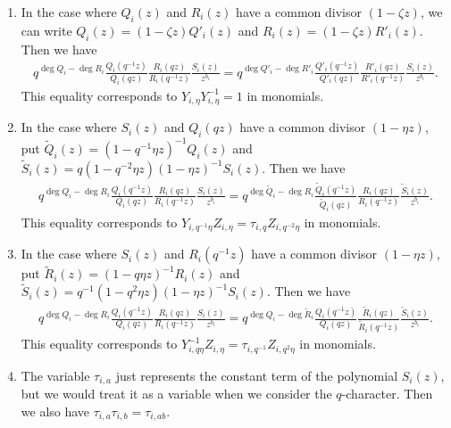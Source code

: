 \documentclass[12pt]{amsart}
\numberwithin{equation}{thm}
\newcommand\z{\zeta}
\newcommand\wt{\widetilde}
\begin{document}
\begin{enumerate}
\item 
In the case where $Q_i(z)$ and $R_i(z)$ have a common divisor $(1 - \z z)$, 
we can write $Q_i(z) = (1 - \z z) Q'_i(z)$ and $R_i (z) = (1- \z z) R'_i(z)$. 
Then we have 
\begin{align}
\label{common Q R}
q^{\deg Q_i - \deg R_i} \frac{Q_i (q^{-1} z)}{Q_i(qz)} \frac{ R_i( q z)}{ R_i (q^{-1} z)} \frac{S_i(z)}{z^{b_i}}
= q^{ \deg Q'_i - \deg R'_i} \frac{Q'_i (q^{-1} z)}{Q'_i(qz)} \frac{ R'_i( q z)}{ R'_i (q^{-1} z)} \frac{S_i(z)}{z^{b_i}}. 
\end{align}
This equality corresponds to $Y_{i, \eta} Y_{i, \eta}^{-1} =1$ in monomials.  


\item 
In the case where $S_i(z)$ and $Q_i(qz)$ have a common divisor $(1 - \eta z)$, 
put $\wt{Q}_i(z) = (1- q^{-1} \eta  z)^{-1} Q_i(z)$ and $\wt{S}_i(z) = q (1 - q^{-2} \eta z) (1 - \eta z)^{-1} S_i(z)$. 
Then we have 
\begin{align}
\label{common S Q} 
q^{\deg Q_i - \deg R_i} \frac{Q_i (q^{-1} z)}{Q_i(qz)} \frac{ R_i( q z)}{ R_i (q^{-1} z)} \frac{S_i(z)}{z^{b_i}} 
=
q^{\deg \wt{Q}_i - \deg R_i} \frac{\wt{Q}_i (q^{-1} z)}{\wt{Q}_i(qz)} \frac{ R_i( q z)}{ R_i (q^{-1} z)} \frac{\wt{S}_i(z)}{z^{b_i}}. 
\end{align}
This equality corresponds to $Y_{i, q^{-1} \eta} Z_{i, \eta} = \tau_{i, q} Z_{i, q^{-2} \eta}$ in monomials.  

\item 
In the case where $S_i(z)$ and $R_i (q^{-1} z)$ have a common divisor $(1 - \eta z)$, 
put $\wt{R}_i(z) = (1 - q \eta z)^{-1} R_i(z)$ and $\wt{S}_i(z) = q^{-1} (1 - q^2 \eta z) (1 - \eta z)^{-1} S_i(z)$. 
Then we have 
\begin{align*}
q^{\deg Q_i - \deg R_i} \frac{Q_i (q^{-1} z)}{Q_i(qz)} \frac{ R_i( q z)}{ R_i (q^{-1} z)} \frac{S_i(z)}{z^{b_i}} 
= q^{\deg Q_i - \deg \wt{R}_i} \frac{Q_i (q^{-1} z)}{Q_i(qz)} \frac{ \wt{R}_i( q z)}{ \wt{R}_i (q^{-1} z)} \frac{\wt{S}_i(z)}{z^{b_i}}. 
\end{align*} 
This equality corresponds to $Y_{i, q\eta}^{-1} Z_{i, \eta} = \tau_{i, q^{-1}} Z_{i, q^2 \eta}$ in monomials.  

\item 
The variable $\tau_{i,a}$ just represents  the constant term of the polynomial $S_i(z)$, 
but we would treat it as a variable when we consider the $q$-character. 
Then we also have $\tau_{i,a} \tau_{i,b} = \tau_{i, ab}$. 
\end{enumerate}
\end{document}
